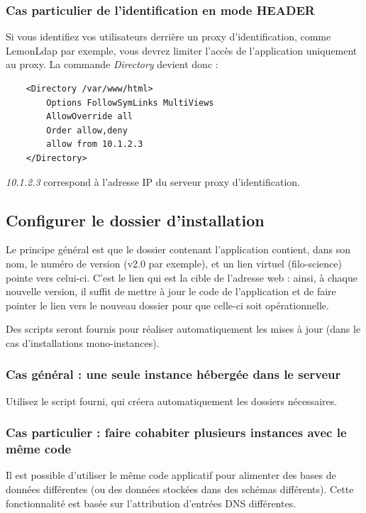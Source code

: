 \subsubsection{Cas particulier de l'identification en mode HEADER}

Si vous identifiez vos utilisateurs derrière un proxy d'identification, comme Lemon\-Ldap par exemple, vous devrez limiter l'accès de l'application uniquement au proxy. La commande \textit{Directory} devient donc :
\begin{lstlisting}
    <Directory /var/www/html>
        Options FollowSymLinks MultiViews
        AllowOverride all
        Order allow,deny
        allow from 10.1.2.3
    </Directory>

\end{lstlisting}
\textit{10.1.2.3} correspond à l'adresse IP du serveur proxy d'identification.

\subsection{Configurer le dossier d'installation}

Le principe général est que le dossier contenant l'application contient, dans son nom, le numéro de version (v2.0 par exemple), et un lien virtuel (filo-science) pointe vers celui-ci. C'est le lien qui est la cible de l'adresse web : ainsi, à chaque nouvelle version, il suffit de mettre à jour le code de l'application et de faire pointer le lien vers le nouveau dossier pour que celle-ci soit opérationnelle.

Des scripts seront fournis pour réaliser automatiquement les mises à jour (dans le cas d'installations mono-instances).

\subsubsection{Cas général : une seule instance hébergée dans le serveur}

Utilisez le script fourni, qui créera automatiquement les dossiers nécessaires. 


\subsubsection{Cas particulier : faire cohabiter plusieurs instances avec le même code}
\label{dnsmultiple}
Il est possible d'utiliser le même code applicatif pour alimenter des bases de données différentes (ou des données stockées dans des schémas différents). Cette fonctionnalité est basée sur l'attribution d'entrées DNS différentes. 

